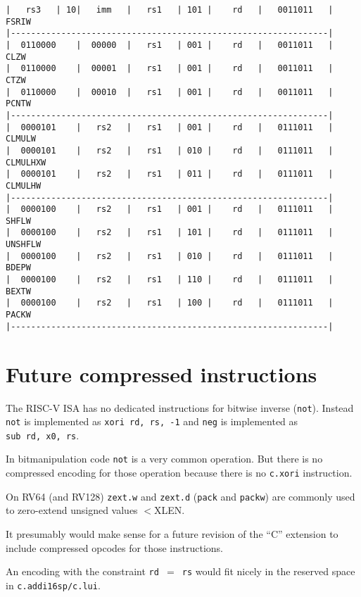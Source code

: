 \begin{minipage}{\linewidth}
\begin{verbatim}
|   rs3   | 10|   imm   |   rs1   | 101 |    rd   |   0011011   |  FSRIW
|---------------------------------------------------------------|
|  0110000    |  00000  |   rs1   | 001 |    rd   |   0011011   |  CLZW
|  0110000    |  00001  |   rs1   | 001 |    rd   |   0011011   |  CTZW
|  0110000    |  00010  |   rs1   | 001 |    rd   |   0011011   |  PCNTW
|---------------------------------------------------------------|
|  0000101    |   rs2   |   rs1   | 001 |    rd   |   0111011   |  CLMULW
|  0000101    |   rs2   |   rs1   | 010 |    rd   |   0111011   |  CLMULHXW
|  0000101    |   rs2   |   rs1   | 011 |    rd   |   0111011   |  CLMULHW
|---------------------------------------------------------------|
|  0000100    |   rs2   |   rs1   | 001 |    rd   |   0111011   |  SHFLW
|  0000100    |   rs2   |   rs1   | 101 |    rd   |   0111011   |  UNSHFLW
|  0000100    |   rs2   |   rs1   | 010 |    rd   |   0111011   |  BDEPW
|  0000100    |   rs2   |   rs1   | 110 |    rd   |   0111011   |  BEXTW
|  0000100    |   rs2   |   rs1   | 100 |    rd   |   0111011   |  PACKW
|---------------------------------------------------------------|
\end{verbatim}
\end{minipage}


\section{Future compressed instructions}

The RISC-V ISA has no dedicated instructions for bitwise inverse (\texttt{not}).
Instead \texttt{not} is implemented as \texttt{xori\ rd,\ rs,\ -1} and
\texttt{neg} is implemented as \texttt{sub\ rd,\ x0,\ rs}.

In bitmanipulation code \texttt{not} is a very common operation. But there is
no compressed encoding for those operation because there is no \texttt{c.xori}
instruction.

On RV64 (and RV128) {\tt zext.w} and {\tt zext.d} ({\tt pack} and {\tt packw})
are commonly used to zero-extend unsigned values $<$XLEN.

It presumably would make sense for a future revision of the ``C'' extension to
include compressed opcodes for those instructions.

An encoding with the constraint \texttt{rd $=$ rs} would fit nicely in the
reserved space in \texttt{c.addi16sp/c.lui}.

